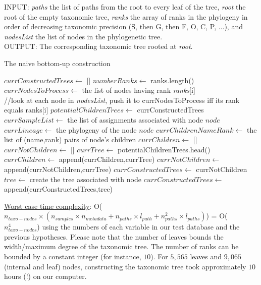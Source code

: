 \documentclass{report}
\begin{document}
\textsc{INPUT:} \emph{paths} the list of paths from the root to every leaf of the tree, \emph{root} the root of the empty taxonomic tree, \emph{ranks} the array of ranks in the phylogeny in order of decreasing taxonomic precision (S, then G, then F, O, C, P, ...), and \emph{nodesList} the list of nodes in the phylogenetic tree.\\

\textsc{OUTPUT:} The corresponding taxonomic tree rooted at \emph{root}.\\

\begin{algorithm}
\caption{The naive bottom-up construction}
\begin{algorithmic}
\STATE $currConstructedTrees \leftarrow$ []
\STATE $numberRanks \leftarrow$ ranks.length()
\STATE $currNodesToProcess \leftarrow$ the list of nodes having rank \emph{ranks}[i]\\ //look at each node in \emph{nodesList}, push it to currNodesToProcess iff its rank equals ranks[i]
\STATE $potentialChildrenTrees \leftarrow$ currConstructedTrees
\STATE $currSampleList \leftarrow$ the list of assignments associated with node $node$
\STATE $currLineage \leftarrow$ the phylogeny of the node $node$
\STATE $currChildrenNameRank \leftarrow$ the list of (name,rank) pairs of node's children
\STATE $currChildren \leftarrow$ []
\STATE $currNotChildren \leftarrow$ []
\STATE $currTree \leftarrow$ potentialChildrenTrees.head()
\STATE $currChildren \leftarrow$ append(currChildren,currTree)
\ELSE
\STATE $currNotChildren \leftarrow$ append(currNotChildren,currTree)
\ENDIF
\STATE $currConstructedTrees \leftarrow$ currNotChildren
\STATE $tree \leftarrow$ create the tree associated with node 
\STATE $currConstructedTrees \leftarrow$ append(currConstructedTrees,tree)
\ENDWHILE
\ENDFOR
\ENDFOR
{}
\end{algorithmic}
\end{algorithm}

\uline{Worst case time complexity}: O($n_{taxo-nodes} \times (n_{samples} \times n_{metadata} + n_{paths} \times l_{path} + n_{paths}^{2} \times l_{paths})$) = O($n_{taxo-nodes}^{4}$) using the numbers of each variable in our test database and the previous hypotheses. Please note that the number of leaves bounds the width/maximum degree of the taxonomic tree. The number of ranks can be bounded by a constant integer (for instance, $10$). For $5,565$ leaves and $9,065$ (internal and leaf) nodes, constructing the taxonomic tree took approximately $10$ hours (!) on our computer.\\
\end{document}

